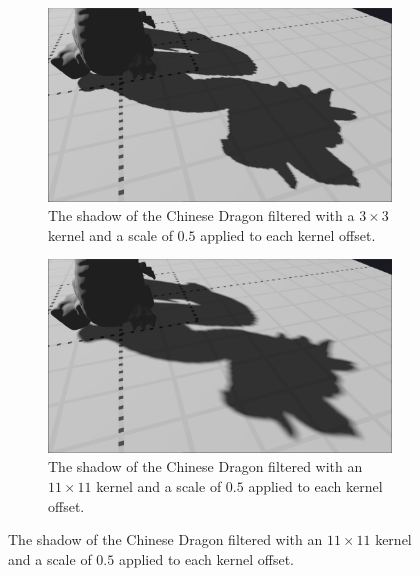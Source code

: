 \begin{figure}[p]
    \begin{subfigure}[t]{0.48\textwidth}
		\centering
        \includegraphics[width=\textwidth]{./graf/tests/pcf/cropped/dragon_pcf_fhd_1024_3x3_offset05.png}
        \caption{The shadow of the Chinese Dragon filtered with a \(3\times 3\) kernel and a scale of \(0.5\) applied to each kernel offset.}
    \end{subfigure}
    \hfill
    \begin{subfigure}[t]{0.48\textwidth}
		\centering
        \includegraphics[width=\textwidth]{./graf/tests/pcf/cropped/dragon_pcf_fhd_1024_11x11_offset05.png}
        \caption{The shadow of the Chinese Dragon filtered with an \(11\times 11\) kernel and a scale of \(0.5\) applied to each kernel offset.}
    \end{subfigure}


\end{figure}
